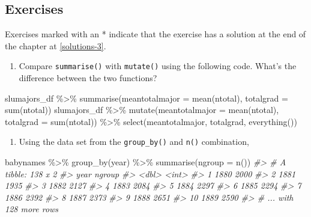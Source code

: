 \documentclass[
]{book}
\newenvironment{Shaded}{\begin{snugshade}}{\end{snugshade}}
\newcommand{\AttributeTok}[1]{\textcolor[rgb]{0.77,0.63,0.00}{#1}}
\newcommand{\CommentTok}[1]{\textcolor[rgb]{0.56,0.35,0.01}{\textit{#1}}}
\newcommand{\FunctionTok}[1]{\textcolor[rgb]{0.00,0.00,0.00}{#1}}
\newcommand{\NormalTok}[1]{#1}
\newcommand{\SpecialCharTok}[1]{\textcolor[rgb]{0.00,0.00,0.00}{#1}}
\providecommand{\tightlist}{%
  \setlength{\itemsep}{0pt}\setlength{\parskip}{0pt}}
\begin{document}
\hypertarget{exercise-3-3}{%
\subsection{Exercises}\label{exercise-3-3}}

Exercises marked with an * indicate that the exercise has a solution at the end of the chapter at \ref{solutions-3}.

\begin{enumerate}
\def\labelenumi{\arabic{enumi}.}
\tightlist
\item
  Compare \texttt{summarise()} with \texttt{mutate()} using the following code. What's the difference between the two functions?
\end{enumerate}

\begin{Shaded}
\begin{Highlighting}[]
\NormalTok{slumajors\_df }\SpecialCharTok{\%\textgreater{}\%}
  \FunctionTok{summarise}\NormalTok{(}\AttributeTok{meantotalmajor =} \FunctionTok{mean}\NormalTok{(ntotal),}
            \AttributeTok{totalgrad =} \FunctionTok{sum}\NormalTok{(ntotal)) }
\NormalTok{slumajors\_df }\SpecialCharTok{\%\textgreater{}\%}
  \FunctionTok{mutate}\NormalTok{(}\AttributeTok{meantotalmajor =} \FunctionTok{mean}\NormalTok{(ntotal),}
            \AttributeTok{totalgrad =} \FunctionTok{sum}\NormalTok{(ntotal)) }\SpecialCharTok{\%\textgreater{}\%}
  \FunctionTok{select}\NormalTok{(meantotalmajor, totalgrad, }\FunctionTok{everything}\NormalTok{())}
\end{Highlighting}
\end{Shaded}

\begin{enumerate}
\def\labelenumi{\arabic{enumi}.}
\setcounter{enumi}{1}
\tightlist
\item
  Using the data set from the \texttt{group\_by()} and \texttt{n()} combination,
\end{enumerate}

\begin{Shaded}
\begin{Highlighting}[]
\NormalTok{babynames }\SpecialCharTok{\%\textgreater{}\%} \FunctionTok{group\_by}\NormalTok{(year) }\SpecialCharTok{\%\textgreater{}\%}
  \FunctionTok{summarise}\NormalTok{(}\AttributeTok{ngroup =} \FunctionTok{n}\NormalTok{())}
\CommentTok{\#\textgreater{} \# A tibble: 138 x 2}
\CommentTok{\#\textgreater{}     year ngroup}
\CommentTok{\#\textgreater{}    \textless{}dbl\textgreater{}  \textless{}int\textgreater{}}
\CommentTok{\#\textgreater{}  1  1880   2000}
\CommentTok{\#\textgreater{}  2  1881   1935}
\CommentTok{\#\textgreater{}  3  1882   2127}
\CommentTok{\#\textgreater{}  4  1883   2084}
\CommentTok{\#\textgreater{}  5  1884   2297}
\CommentTok{\#\textgreater{}  6  1885   2294}
\CommentTok{\#\textgreater{}  7  1886   2392}
\CommentTok{\#\textgreater{}  8  1887   2373}
\CommentTok{\#\textgreater{}  9  1888   2651}
\CommentTok{\#\textgreater{} 10  1889   2590}
\CommentTok{\#\textgreater{} \# ... with 128 more rows}
\end{Highlighting}
\end{Shaded}
\end{document}
